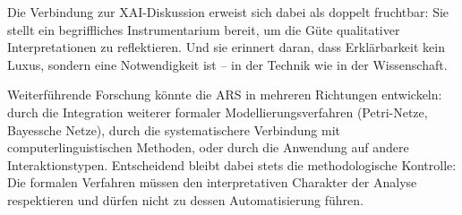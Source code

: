 \documentclass[
  12pt,
  a4paper,
  oneside,
  titlepage
]{article}
\begin{document}
Die Verbindung zur XAI-Diskussion erweist sich dabei als doppelt fruchtbar: 
Sie stellt ein begriffliches Instrumentarium bereit, um die Güte qualitativer 
Interpretationen zu reflektieren. Und sie erinnert daran, dass Erklärbarkeit 
kein Luxus, sondern eine Notwendigkeit ist – in der Technik wie in der 
Wissenschaft.

Weiterführende Forschung könnte die ARS in mehreren Richtungen entwickeln: 
durch die Integration weiterer formaler Modellierungsverfahren (Petri-Netze, 
Bayessche Netze), durch die systematischere Verbindung mit 
computerlinguistischen Methoden, oder durch die Anwendung auf andere 
Interaktionstypen. Entscheidend bleibt dabei stets die methodologische 
Kontrolle: Die formalen Verfahren müssen den interpretativen Charakter der 
Analyse respektieren und dürfen nicht zu dessen Automatisierung führen.
\end{document}
